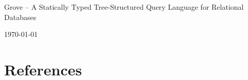 \documentclass[12pt]{article}
\begin{document}
\begin{titlepage}

	\begin{center}
		\huge Grove -- A Statically Typed Tree-Structured Query Language for Relational Databases

		\large \today
	\end{center}

\end{titlepage}

\clearpage

\tableofcontents

\clearpage



\clearpage



\clearpage



\clearpage



\clearpage



\clearpage



\clearpage

\section{References}

\printbibliography

%
\end{document}
